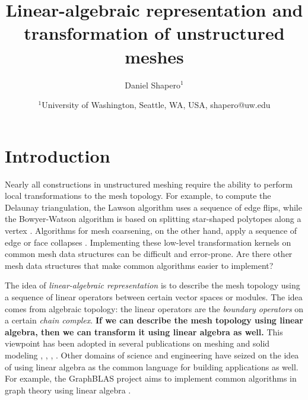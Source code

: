 \documentclass[twocolumn]{article}
\begin{document}
\title{Linear-algebraic representation and transformation of unstructured meshes}
\author{Daniel Shapero$^1$}
\date{
    $^1$University of Washington, Seattle, WA, USA, shapero@uw.edu
}



\maketitle
\thispagestyle{empty}
\pagestyle{empty}


\section{Introduction}

Nearly all constructions in unstructured meshing require the ability to perform local transformations to the mesh topology.
For example, to compute the Delaunay triangulation, the Lawson algorithm uses a sequence of edge flips, while the Bowyer-Watson algorithm is based on splitting star-shaped polytopes along a vertex \cite{cheng2013delaunay}.
Algorithms for mesh coarsening, on the other hand, apply a sequence of edge or face collapses \cite{cignoni1998comparison}.
Implementing these low-level transformation kernels on common mesh data structures can be difficult and error-prone.
Are there other mesh data structures that make common algorithms easier to implement?

The idea of \emph{linear-algebraic representation} is to describe the mesh topology using a sequence of linear operators between certain vector spaces or modules.
The idea comes from algebraic topology: the linear operators are the \emph{boundary operators} on a certain \emph{chain complex}.
\textbf{If we can describe the mesh topology using linear algebra, then we can transform it using linear algebra as well.}
This viewpoint has been adopted in several publications on meshing and solid modeling \cite{dicarlo2007solid}, \cite{dicarlo2014linear}, \cite{mueller2017ternary}, \cite{paoluzzi2020topological}.
Other domains of science and engineering have seized on the idea of using linear algebra as the common language for building applications as well.
For example, the GraphBLAS project aims to implement common algorithms in graph theory using linear algebra \cite{mattson2013standards}.
\end{document}
